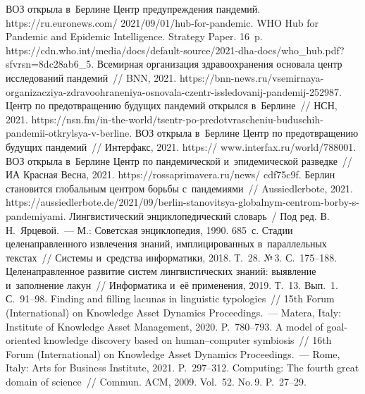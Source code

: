 \begin{multicols}{2}
{{\begin{thebibliography}{99}
 ВОЗ открыла в~Берлине Центр предупреждения пандемий. {\sf 
https://ru.euronews.com/ 2021/09/01/hub-for-pandemic}.
WHO Hub for Pandemic and Epidemic Intelligence. Strategy Paper. 16~p. {\sf 
https://cdn.who.int/media/docs/\linebreak default-source/2021-dha-docs/who\_hub.pdf?sfvrsn=8d\linebreak c28ab6\_5}.
Всемирная организация здравоохранения основала центр исследований пандемий~// BNN, 2021. 
{\sf https://\linebreak bnn-news.ru/vsemirnaya-organizacziya-zdravoohraneniya-osnovala-czentr-issledovanij-pandemij-252987}.
Центр по предотвращению будущих пандемий открылся в~Берлине~// НСН, 2021. {\sf https://nsn.fm/in-the-world/tsentr-po-predotvrascheniu-buduschih-pandemii-otkrylsya-v-berline}.
ВОЗ открыла в~Берлине Центр по предотвращению будущих пандемий~// Интерфакс, 
 2021. {\sf https:// www.interfax.ru/world/788001}.
ВОЗ открыла в~Берлине Центр по пандемической и~эпидемической разведке~// ИА Красная 
Весна, 2021. {\sf https://rossaprimavera.ru/news/ cdf75c9f}.
Берлин становится глобальным центром борьбы с~пандемиями~// Aussiedlerbote, 2021. 
{\sf https://\linebreak aussiedlerbote.de/2021/09/berlin-stanovitsya-globalnym-centrom-borby-s-pandemiyami}.
Лингвистический энциклопедический словарь~/ Под ред. В.\,Н.~Ярцевой.~--- М.: Советская 
энциклопедия, 1990. 685~с. 
 Стадии целенаправленного извлечения знаний, имплицированных 
в~параллельных текстах~// Системы и~средства информатики, 2018. Т.~28. №\,3. С.~175--188.
 Целенаправленное развитие систем лингвистических знаний: выявление 
и~заполнение лакун~// Информатика и~её применения, 2019. Т.~13. Вып.~1. С.~91--98.
 Finding and filling lacunas in linguistic typologies~// 15th  Forum  (International) on 
Knowledge Asset Dynamics Proceedings.~--- Matera, Italy: Institute of Knowledge Asset 
Management, 2020. P.~780--793.
 A model of goal-oriented knowledge discovery based on human--computer 
symbiosis~// 16th Forum (International) on Knowledge Asset Dynamics Proceedings.~--- Rome, Italy: 
Arts for Business Institute, 2021. P.~297--312.
 Computing: The fourth great domain of science~// 
Commun. ACM, 2009. Vol.~52. No.\,9. P.~27--29.

\end{thebibliography}}}
\end{multicols}
